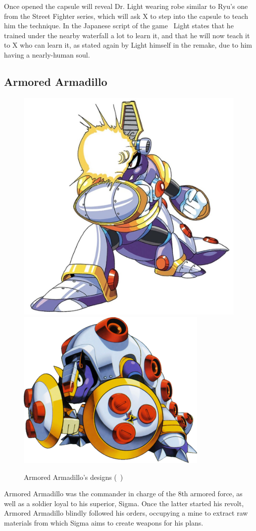 Once opened the capsule will reveal Dr. Light wearing robe similar to Ryu's one from the Street Fighter series, which will ask X to step into the capsule to teach him the technique. In the Japanese  script of the game~\cite{wordpress:X_japanese_script} Light states that he trained under the nearby waterfall a lot to learn it, and that he will now teach it to X who can learn it, as stated again by Light himself in the remake, due to him having a nearly-human soul.


\subsection{Armored Armadillo}\label{boss:Armored_Armadillo}
\begin{figure}[htp]
	\centering
	\includegraphics[width=0.3\linewidth]{figures/X1/Armored_armadillo/Armored_armadillo.jpg}
	\includegraphics[width=0.4\linewidth]{figures/X1/Armored_armadillo/MHXArmoredArmadillo.png}
	\caption{Armored Armadillo's designs (~\cite{book:MMX_Complete_art})}
\end{figure}
Armored Armadillo was the commander in charge of the 8th armored force, as well as a soldier loyal to his superior, Sigma. Once the latter started his revolt, Armored Armadillo blindly followed his orders, occupying a mine to extract raw materials from which Sigma aims to create weapons for his plans.

